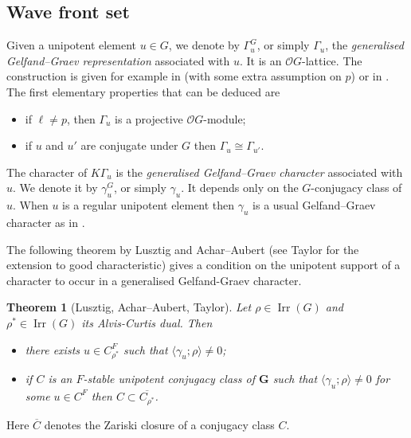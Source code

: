 \documentclass[12pt,leqno,a4paper]{amsart}
\newcommand{\bG}{{\mathbf{G}}}
\newcommand{\cO}{{\mathcal{O}}}
\newcommand{\Irr}{{\operatorname{Irr}}}
\newtheorem{thm}{Theorem}[section]
\theoremstyle{remark}
\begin{document}
\subsection{Wave front set}
Given a unipotent element $u \in G$, we denote by $\Gamma_u^G$, or
simply $\Gamma_u$, the
\emph{generalised Gelfand--Graev representation} associated with $u$. It is an
$\cO G$-lattice. The construction is given for example in \cite[\S3.1.2]{Kaw82}
(with some extra assumption on $p$) or in \cite[\S5]{Tay14}.
The first elementary properties that can be deduced are
\begin{itemize}
 \item if $\ell \neq p$, then $\Gamma_u$ is a projective $\cO G$-module;
 \item if $u$ and $u'$ are conjugate under $G$ then $\Gamma_u\cong\Gamma_{u'}$.
\end{itemize}
The character of $K\Gamma_u$ is the \emph{generalised Gelfand--Graev character}
associated with $u$. We denote it by $\gamma_u^G$, or simply $\gamma_u$. It
depends only on the $G$-conjugacy class of $u$. When $u$ is a regular unipotent
element then $\gamma_u$ is a usual Gelfand--Graev character as in
\cite[\S14]{DM91}.
\smallskip

The following theorem by Lusztig \cite[Thm.~11.2]{Lu92} and
Achar--Aubert \cite[Thm.~9.1]{AA07} (see Taylor \cite{Tay14} for
the extension to good characteristic) gives a condition on the unipotent
support of a character to occur in a generalised Gelfand-Graev character.

\begin{thm}[Lusztig, Achar--Aubert, Taylor]   \label{thm:wave}
 Let $\rho \in \Irr(G)$ and $\rho^* \in \Irr(G)$ its Alvis-Curtis dual. Then
 \begin{itemize}
  \item[\rm(a)] there exists $u\in C_{\rho^*}^F$ such that
   $\langle\gamma_u;\rho\rangle \neq 0$;
  \item[\rm(b)] if $C$ is an $F$-stable unipotent conjugacy class of $\bG$
   such that $\langle \gamma_{u};\rho\rangle \neq 0$ for some $u \in {C}^F$
   then $C \subset \overline{C_{\rho^*}}$.
 \end{itemize}
\end{thm}

Here $\overline{C}$ denotes the Zariski closure of a conjugacy class $C$.

\end{document}
